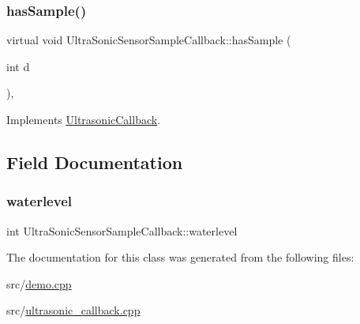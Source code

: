 \mbox{\label{classUltraSonicSensorSampleCallback_abe420043f2ea2123654d55d06d9315ac}} 
\subsubsection{\texorpdfstring{has\+Sample()}{hasSample()}\hspace{0.1cm}{\footnotesize\ttfamily [2/2]}}
{\footnotesize\ttfamily virtual void Ultra\+Sonic\+Sensor\+Sample\+Callback\+::has\+Sample (\begin{DoxyParamCaption}\item[{int}]{d }\end{DoxyParamCaption})\hspace{0.3cm}{\ttfamily [inline]}, {\ttfamily [virtual]}}



Implements \hyperlink{classUltrasonicCallback_aded93e2bea7669f1f225f8b35a085052}{Ultrasonic\+Callback}.



\subsection{Field Documentation}
\mbox{\label{classUltraSonicSensorSampleCallback_ad5fd882233b06c49bcf04f97ae8b7ccb}} 
\subsubsection{\texorpdfstring{waterlevel}{waterlevel}}
{\footnotesize\ttfamily int Ultra\+Sonic\+Sensor\+Sample\+Callback\+::waterlevel}



The documentation for this class was generated from the following files\+:\begin{DoxyCompactItemize}
\item 
src/\hyperlink{demo_8cpp}{demo.\+cpp}\item 
src/\hyperlink{ultrasonic__callback_8cpp}{ultrasonic\+\_\+callback.\+cpp}\end{DoxyCompactItemize}
